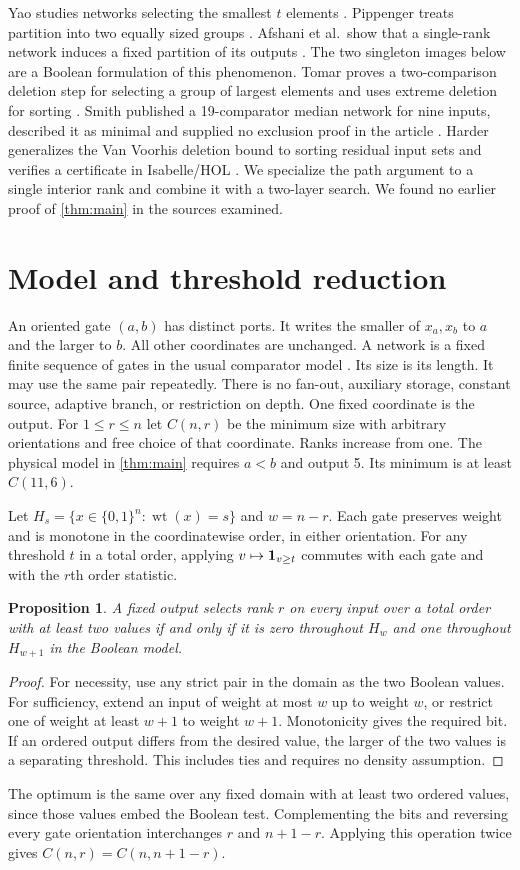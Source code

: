 \documentclass[11pt,reqno]{amsart}
\newtheorem{proposition}[theorem]{Proposition}
\newcommand{\wt}{\operatorname{wt}}
\begin{document}
Yao studies networks selecting the smallest $t$ elements \cite{yao}.
Pippenger treats partition into two equally sized groups \cite{pippenger}.
Afshani et al.\ show that a single-rank network induces a fixed partition of
its outputs \cite[Lemmas 17--18]{afshani}. The two singleton images below
are a Boolean formulation of this phenomenon. Tomar proves a two-comparison
deletion step for selecting a group of largest elements \cite[Lemma 1.4]{tomar}
and uses extreme deletion for sorting \cite{tomarsort}. Smith published a
19-comparator median network for nine inputs, described it as minimal and
supplied no exclusion proof in the article \cite[Fig.~1]{smith}. Harder generalizes
the Van Voorhis deletion bound to sorting residual input sets and verifies
a certificate in Isabelle/HOL \cite{harder}. We specialize the path argument
to a single interior rank and combine it with a two-layer search. We found
no earlier proof of \cref{thm:main} in the sources examined.


\section{Model and threshold reduction}
An oriented gate $(a,b)$ has distinct ports. It writes the smaller of $x_a,x_b$
to $a$ and the larger to $b$. All other coordinates are unchanged.
A network is a fixed finite sequence of gates in the usual comparator model \cite{knuth}. Its size is its length.
It may use the same pair repeatedly. There is no fan-out, auxiliary storage,
constant source, adaptive branch, or restriction on depth. One fixed
coordinate is the output. For $1\le r\le n$ let $C(n,r)$ be the minimum
size with arbitrary orientations and free choice of that coordinate. Ranks
increase from one. The physical model in \cref{thm:main} requires $a<b$
and output 5. Its minimum is at least $C(11,6)$.

Let $H_s=\{x\in\{0,1\}^n:\wt(x)=s\}$ and $w=n-r$. Each gate preserves
weight and is monotone in the coordinatewise order, in either orientation.
For any threshold $t$ in a total order, applying $v\mapsto{\bf1}_{v\ge t}$
commutes with each gate and with the $r$th order statistic.
\begin{proposition}\label{prop:zero}
A fixed output selects rank $r$ on every input over a total order with at
least two values if and only if it is zero throughout $H_w$ and one
throughout $H_{w+1}$ in the Boolean model.
\end{proposition}
\begin{proof}
For necessity, use any strict pair in the domain as the two Boolean
values. For sufficiency, extend an input of weight at most $w$
up to weight $w$, or restrict one of weight at least $w+1$ to weight $w+1$.
Monotonicity gives the required bit. If an ordered output differs from the
desired value, the larger of the two values is a separating threshold.
This includes ties and requires no density assumption.
\end{proof}
The optimum is the same over any fixed domain with at least two ordered
values, since those values embed the Boolean test. Complementing the bits
and reversing every gate orientation interchanges $r$ and $n+1-r$.
Applying this operation twice gives $C(n,r)=C(n,n+1-r)$.
\end{document}
